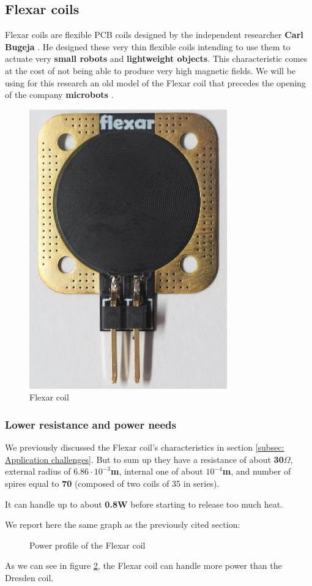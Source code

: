 \subsection{Flexar coils}
Flexar coils are flexible PCB coils designed by the independent researcher \textbf{Carl Bugeja} \cite{Carl_Bugeja}.
He designed these very thin flexible coils intending to use them to actuate very \textbf{small robots} and \textbf{lightweight objects}.
This characteristic comes at the cost of not being able to produce very high magnetic fields.
We will be using for this research an old model of the Flexar coil that precedes the opening of the company \textbf{microbots} \cite{microbots}.
\begin{figure}[H]
    \centering
    \includegraphics[width=0.4\linewidth]{Chapters/Chapter5/Coils_alternatives/Figures/Flexar_coil.png}
    \caption{Flexar coil }
    \label{fig:Flexar_coil}
\end{figure}


\subsubsection{Lower resistance and power needs}
We previously discussed the Flexar coil's characteristics in section \ref{subsec: Application challenges}.
But to sum up they have a resistance of about \textbf{30$\Omega$}, external radius of \textbf{$6.86\cdot10^{-3}$m}, internal one of about \textbf{$10^{-4}$m}, and number of spires equal to \textbf{70} (composed of two coils of 35 in series).

\begin{samepage}
    It can handle up to about \textbf{0.8W} before starting to release too much heat.
    \nopagebreak

    We report here the same graph as the previously cited section:
    \nopagebreak

    \begin{figure}[H]
        \centering
        \resizebox{0.5\textwidth}{!}{
            
        }
        \caption{Power profile of the Flexar coil}
        \label{fig: Flexar_heat_graph}
    \end{figure}
    \nopagebreak

    As we can see in figure \ref{fig: Flexar_heat_graph}, the Flexar coil can handle more power than the Dresden coil.
\end{samepage}

